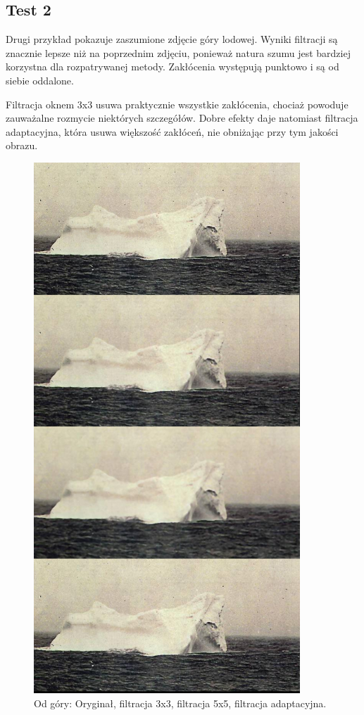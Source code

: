\documentclass[a4paper,12pt,oneside,notitlepage,onecolumn]{article}
\begin{document}
\subsection{Test 2}
Drugi przykład pokazuje zaszumione zdjęcie góry lodowej.
Wyniki filtracji są znacznie lepsze niż na poprzednim zdjęciu, ponieważ natura szumu jest bardziej korzystna dla rozpatrywanej metody.
Zakłócenia występują punktowo i są od siebie oddalone.

Filtracja oknem 3x3 usuwa praktycznie wszystkie zakłócenia, chociaż powoduje zauważalne rozmycie niektórych szczegółów.
Dobre efekty daje natomiast filtracja adaptacyjna, która usuwa większość zakłóceń, nie obniżając przy tym jakości obrazu.

\begin{figure}
\centering
\includegraphics[width=10cm]{test2_final.jpg}
\caption{Od góry: Oryginał, filtracja 3x3, filtracja 5x5, filtracja adaptacyjna.}
\end{figure}
\end{document}
